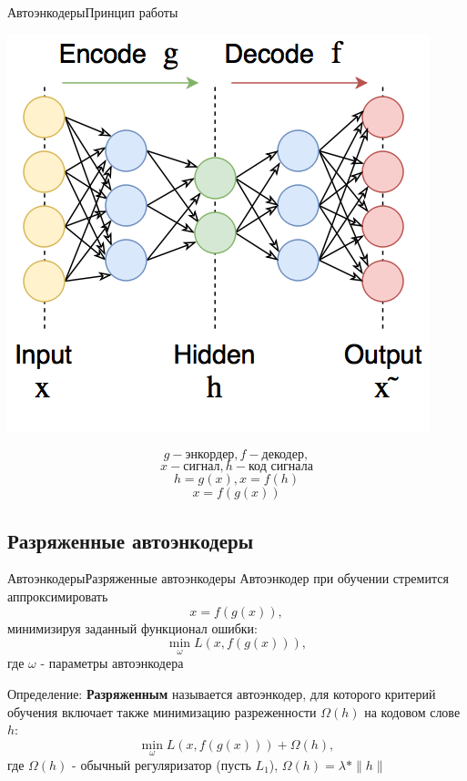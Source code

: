 \documentclass{beamer}
\begin{document}
\begin{frame}{Автоэнкодеры}{Принцип работы}

\begin{minipage}{0.4\textwidth}
\begin{flushleft}
	\includegraphics[scale=0.35]{ae_1}
\end{flushleft}
\end{minipage}
\hfill
\begin{minipage}{0.4\textwidth}
\begin{center}
		$$g - \text{энкордер}, f - \text{декодер},$$
		$$x - \text{сигнал}, h - \text{код сигнала}$$
		$$h = g(x), x = f(h)$$
		\begin{equation}\label{eq:aim_func}
			x = f(g(x))
		\end{equation}
\end{center}
\end{minipage}

\end{frame}

\subsection{Разряженные автоэнкодеры}

\begin{frame}{Автоэнкодеры}{Разряженные автоэнкодеры}
Автоэнкодер при обучении стремится аппроксимировать  $$x = f(g(x)),$$ минимизируя заданный функционал ошибки:
\begin{equation}
\min_{\omega} L(x, f(g(x))),
\end{equation}
где $\omega$ - параметры автоэнкодера

\begin{block}{Определение:}
	\textbf{Разряженным} называется автоэнкодер, для которого критерий обучения включает также минимизацию разреженности $\Omega(h)$ на кодовом слове $h$:
	$$\min_{\omega} L(x, f(g(x))) + \Omega(h),$$
	где $\Omega(h)$ - обычный регуляризатор (пусть $L_1$), $\Omega(h) = \lambda*\|h\|$
\end{block}

\end{frame}
\end{document}
